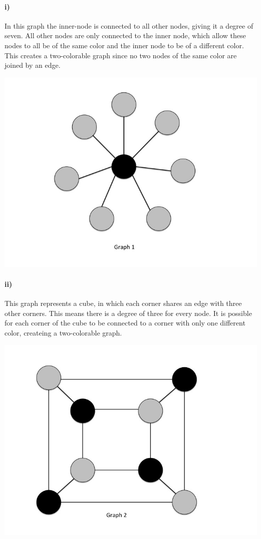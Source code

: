 \documentclass[10pt,letter]{article}
\begin{document}
\paragraph{i)}
In this graph the inner-node is connected to all other nodes, giving it a degree of seven. All other nodes are only connected to the inner node, which allow these nodes to all be of the same color and the inner node to be of a different color. This creates a two-colorable graph since no two nodes of the same color are joined by an edge. \\
\begin{minipage}{.8\textwidth}
\includegraphics[width=.8\linewidth]{hw3_slide1.jpg}
\end{minipage}

\paragraph{ii)}
This graph represents a cube, in which each corner shares an edge with three other corners. This means there is a degree of three for every node. It is possible for each corner of the cube to be connected to a corner with only one different color, createing a two-colorable graph. \\
\begin{minipage}{.8\textwidth}
\includegraphics[width=.8\linewidth]{hw3_slide2.jpg}
\end{minipage}
\end{document}
